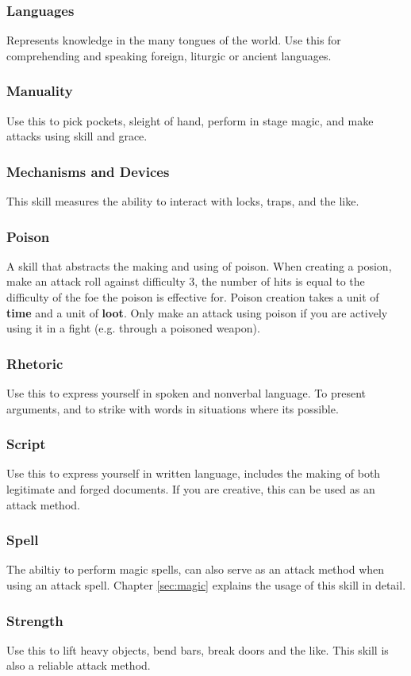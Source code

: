 \subsubsection*{Languages}
Represents knowledge in the many tongues of the world. Use this for comprehending and speaking foreign, liturgic or ancient languages.
\subsubsection*{Manuality}
Use this to pick pockets, sleight of hand, perform in stage magic, and make attacks using skill and grace.
\subsubsection*{Mechanisms and Devices}
This skill measures the ability to interact with locks, traps, and the like.
\subsubsection*{Poison}
A skill that abstracts the making and using of poison. When creating a posion, make an attack roll against difficulty 3, the number of hits is equal to the difficulty of the foe the poison is effective for. Poison creation takes a unit of \textbf{time} and a unit of \textbf{loot}. Only make an attack using poison if you are actively using it in a fight (e.g. through a poisoned weapon).
\subsubsection*{Rhetoric}
Use this to express yourself in spoken and nonverbal language. To present arguments, and to strike with words in situations where its possible.
\subsubsection*{Script}
Use this to express yourself in written language, includes the making of both legitimate and forged documents. If you are creative, this can be used as an attack method.
\subsubsection*{Spell}
The abiltiy to perform magic spells, can also serve as an attack method when using an attack spell. Chapter \ref{sec:magic} explains the usage of this skill in detail.
\subsubsection*{Strength}
Use this to lift heavy objects, bend bars, break doors and the like. This skill is also a reliable attack method.
